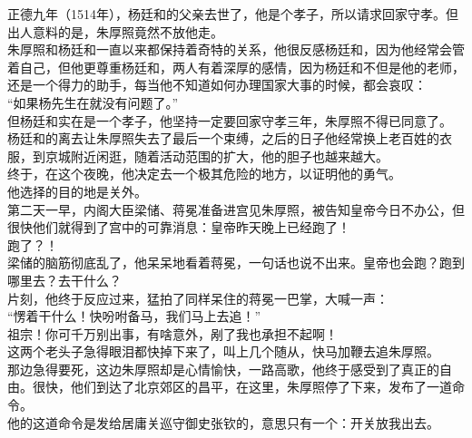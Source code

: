 \begin{multicols}{\theparacolNo}
正德九年（1514年），杨廷和的父亲去世了，他是个孝子，所以请求回家守孝。但出人意料的是，朱厚照竟然不放他走。\\

朱厚照和杨廷和一直以来都保持着奇特的关系，他很反感杨廷和，因为他经常会管着自己，但他更尊重杨廷和，两人有着深厚的感情，因为杨廷和不但是他的老师，还是一个得力的助手，每当他不知道如何办理国家大事的时候，都会哀叹：\\

“如果杨先生在就没有问题了。”\\

但杨廷和实在是一个孝子，他坚持一定要回家守孝三年，朱厚照不得已同意了。\\

杨廷和的离去让朱厚照失去了最后一个束缚，之后的日子他经常换上老百姓的衣服，到京城附近闲逛，随着活动范围的扩大，他的胆子也越来越大。\\

终于，在这个夜晚，他决定去一个极其危险的地方，以证明他的勇气。\\

他选择的目的地是关外。\\

第二天一早，内阁大臣梁储、蒋冕准备进宫见朱厚照，被告知皇帝今日不办公，但很快他们就得到了宫中的可靠消息：皇帝昨天晚上已经跑了！\\

跑了？！\\

梁储的脑筋彻底乱了，他呆呆地看着蒋冕，一句话也说不出来。皇帝也会跑？跑到哪里去？去干什么？\\

片刻，他终于反应过来，猛拍了同样呆住的蒋冕一巴掌，大喊一声：\\

“愣着干什么！快吩咐备马，我们马上去追！”\\

祖宗！你可千万别出事，有啥意外，剐了我也承担不起啊！\\

这两个老头子急得眼泪都快掉下来了，叫上几个随从，快马加鞭去追朱厚照。\\

那边急得要死，这边朱厚照却是心情愉快，一路高歌，他终于感受到了真正的自由。很快，他们到达了北京郊区的昌平，在这里，朱厚照停了下来，发布了一道命令。\\

他的这道命令是发给居庸关巡守御史张钦的，意思只有一个：开关放我出去。\\


\end{multicols}
